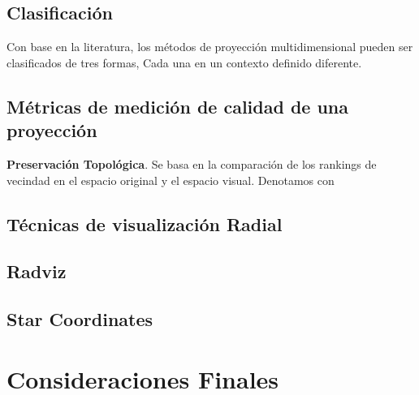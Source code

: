 \subsection{Clasificación}
Con base en la literatura, los métodos de proyección multidimensional pueden ser clasificados de tres formas, Cada una en un contexto  definido diferente.

\subsection{Métricas de medición de calidad de una proyección}
\textbf{Preservación Topológica}. Se basa en la comparación de los rankings de vecindad en el espacio original y el espacio visual. Denotamos con 
		\subsection{Técnicas de visualización Radial}
		\subsection{Radviz}
		\subsection{Star Coordinates}
\section{Consideraciones Finales}
